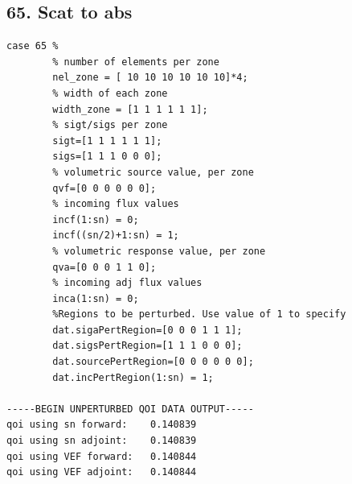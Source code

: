\documentclass{article}
\begin{document}
\subsection{65. Scat to abs}
\begin{verbatim}
case 65 %
        % number of elements per zone
        nel_zone = [ 10 10 10 10 10 10]*4;
        % width of each zone
        width_zone = [1 1 1 1 1 1];
        % sigt/sigs per zone
        sigt=[1 1 1 1 1 1];
        sigs=[1 1 1 0 0 0];
        % volumetric source value, per zone
        qvf=[0 0 0 0 0 0];
        % incoming flux values
        incf(1:sn) = 0;
        incf((sn/2)+1:sn) = 1;
        % volumetric response value, per zone
        qva=[0 0 0 1 1 0];
        % incoming adj flux values
        inca(1:sn) = 0;
        %Regions to be perturbed. Use value of 1 to specify
        dat.sigaPertRegion=[0 0 0 1 1 1];
        dat.sigsPertRegion=[1 1 1 0 0 0];
        dat.sourcePertRegion=[0 0 0 0 0 0];
        dat.incPertRegion(1:sn) = 1; 
        
-----BEGIN UNPERTURBED QOI DATA OUTPUT----- 
qoi using sn forward: 	 0.140839 
qoi using sn adjoint: 	 0.140839 
qoi using VEF forward: 	 0.140844 
qoi using VEF adjoint: 	 0.140844 
\end{verbatim}
\end{document}
